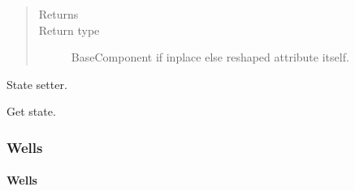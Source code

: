 \documentclass[letterpaper,10pt,english]{sphinxmanual}
\begin{document}
\begin{fulllineitems}
\begin{fulllineitems}
\begin{quote}
\begin{description}
\item[{Returns}] \leavevmode
{}

\item[{Return type}] \leavevmode
BaseComponent if inplace else reshaped attribute itself.

\end{description}\end{quote}

\end{fulllineitems}


\begin{fulllineitems}
\label{\detokenize{api/tables:geology.src.Tables.set_state}}
State setter.

\end{fulllineitems}


\begin{fulllineitems}
\label{\detokenize{api/tables:geology.src.Tables.state}}
Get state.

\end{fulllineitems}


\end{fulllineitems}



\subsubsection{Wells}
\label{\detokenize{api/wells:wells}}\label{\detokenize{api/wells::doc}}

\paragraph{Wells}
\label{\detokenize{api/wells:id1}}
\end{document}
